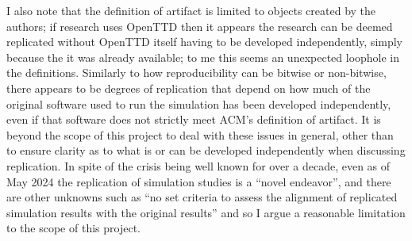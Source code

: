 \documentclass[logo,msc,dsti]{infthesis}    %
\begin{document}
I also note that the definition of artifact is limited to objects created by the authors; if research uses OpenTTD then it appears the research can be deemed replicated without OpenTTD itself having to be developed independently, simply because the it was already available; to me this seems an unexpected loophole in the definitions. Similarly to how reproducibility can be bitwise or non-bitwise, there appears to be degrees of replication that depend on how much of the original software used to run the simulation has been developed independently, even if that software does not strictly meet ACM's definition of artifact. It is beyond the scope of this project to deal with these issues in general, other than to ensure clarity as to what is or can be developed independently when discussing replication. In spite of the crisis being well known for over a decade, even as of May 2024 the replication of simulation studies is a ``novel endeavor'', and there are other unknowns such as ``no set criteria to assess the alignment of replicated simulation results with the original results'' \cite{luijken2024replicability} and so I argue a reasonable limitation to the scope of this project.







\end{document}
